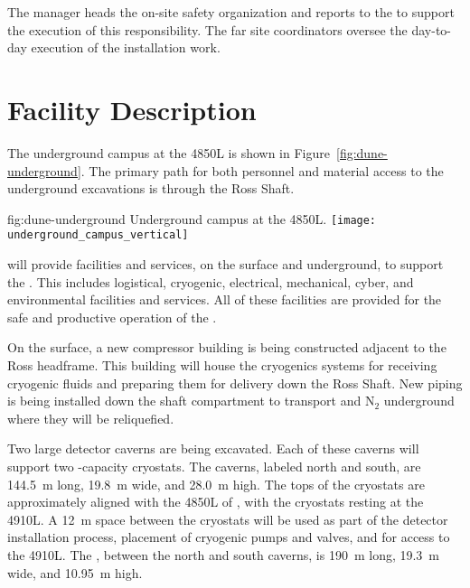 The 
 manager heads the on-site safety organization and reports
to the  to support the execution of this
responsibility. The far site  coordinators %
oversee the day-to-day execution
of the installation work.

\section{Facility Description}
\label{sec:es-tc-facility}

The  underground campus at the  4850L is shown in
Figure~\ref{fig:dune-underground}. The primary path for both personnel 
and material access to the underground excavations is through the Ross Shaft.
\begin{dunefigure}{fig:dune-underground}
  {Underground campus at the 4850L.}
  \texttt{[image: underground\_campus\_vertical]}
\end{dunefigure}

 will provide facilities and services, on the surface and
underground, to support the  .  This includes
logistical, cryogenic, electrical, mechanical, cyber, and environmental
facilities and services.  All of these facilities are provided for the
safe and productive operation of the .

On the surface, a new compressor building is being constructed
adjacent to the Ross headframe.  This building will house the cryogenics
systems for receiving cryogenic fluids and preparing them for delivery
down the Ross Shaft.  New piping is being installed down the 
shaft compartment to transport  and N$_2$ underground
where they will be reliquefied.


Two large detector caverns
are being excavated.  Each of these caverns will support two
\larmass{}-capacity cryostats.  The caverns, labeled north and
south, are \SI{144.5}{\meter} long, \SI{19.8}{\meter} wide,  and 
\SI{28.0}{\meter} high. The tops of the cryostats are approximately
aligned with the 4850L of , with the cryostats resting
at the 4910L.  A \SI{12}{\meter} space between the cryostats will
be used as part of the detector installation process, placement of
cryogenic pumps and valves, and for access to the 4910L.  The
, between the north and south caverns, is \SI{190}{\meter}
long, \SI{19.3}{\meter} wide, and \SI{10.95}{\meter} high. 

